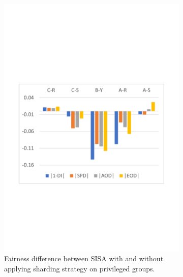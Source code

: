 \begin{figure}[htbp!]
  \centering
  \begin{subfigure}[b]{0.24\textwidth}
  \centering
  \includegraphics[width=\textwidth]{assets/rq3-with-without-sharding-strategy-diff-privileged.pdf}
  \caption{Fairness difference between SISA with and without applying sharding strategy on privileged groups.}
  \label{fig:rq3-with-without-sharding-strategy-diff-privileged}
  \end{subfigure}
  \begin{subfigure}[b]{0.24\textwidth}
  \centering

\end{subfigure}
\end{figure}
